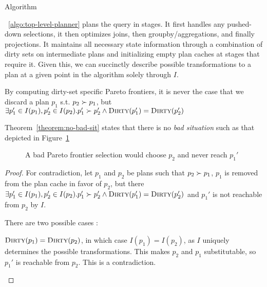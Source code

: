 Algorithm{~\ref{algo:top-level-planner} plans the query in stages. It first handles any pushed-down selections, it then optimizes joins, then groupby/aggregations,
and finally projections. It maintains all necessary state information through a combination of dirty sets on intermediate plans and
initializing empty plan caches at stages that require it. Given this, we can succinctly describe possible transformations to a plan at a given
point in the algorithm solely through $I$.


\begin{theorem}\label{theorem:no-bad-sit}
By computing dirty-set specific Pareto frontiers, it is never the case that we discard a plan $p_1$ s.t. $p_2 \succ p_1$, but $\exists p_1' \in I(p_1), p_2' \in I(p_2). p_1' \succ p_2' \land \textsc{Dirty}(p_1') = \textsc{Dirty}(p_2')$
\end{theorem}

Theorem~\ref{theorem:no-bad-sit} states that there is no \textit{bad situation} such as that depicted in Figure~\ref{fig:bad-sit-diagram}

\begin{figure}
\centering
{}
\caption{A bad Pareto frontier selection would choose $p_2$ and never reach $p_1'$}
\label{fig:bad-sit-diagram}
\end{figure}

\begin{proof}
For contradiction, let $p_1$ and $p_2$ be plans such that $p_2 \succ p_1$, $p_1$ is removed from the plan cache
in favor of $p_2$, but there  $\exists p_1' \in I(p_1), p_2' \in I(p_2). p_1' \succ p_2' \land \textsc{Dirty}(p_1') = \textsc{Dirty}(p_2')$
and $p_1'$ is not reachable from $p_2$ by $I$.

There are two possible cases :

\begin{case}
$\textsc{Dirty}(p_1) = \textsc{Dirty}(p_2)$, in which case $I(p_1) = I(p_2)$, as $I$ uniquely determines the possible transformations. This makes $p_2$ and $p_1$ substitutable, so $p_1'$ is reachable from $p_2$. This is a contradiction.
\end{case}


\end{proof}}
